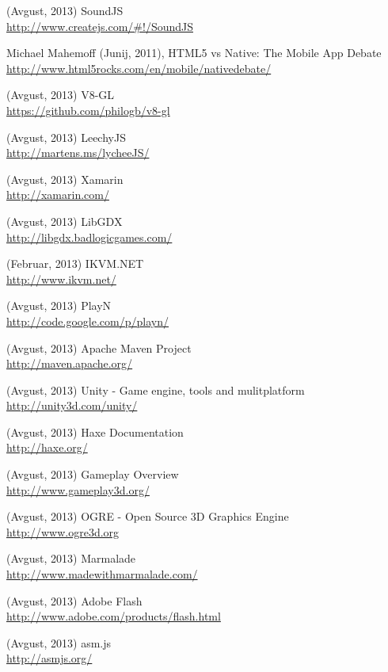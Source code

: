 \begin{thebibliography}{1}
 (Avgust, 2013) SoundJS
\\ \url{http://www.createjs.com/\#!/SoundJS}

 Michael Mahemoff (Junij, 2011), HTML5 vs Native: The Mobile App Debate
\\ \url{http://www.html5rocks.com/en/mobile/nativedebate/}

 (Avgust, 2013) V8-GL 
\\ \url{https://github.com/philogb/v8-gl}

 (Avgust, 2013) LeechyJS 
\\ \url{http://martens.ms/lycheeJS/}

 (Avgust, 2013) Xamarin
\\ \url{http://xamarin.com/}

 (Avgust, 2013) LibGDX 
\\ \url{http://libgdx.badlogicgames.com/}

 (Februar, 2013) IKVM.NET
\\ \url{http://www.ikvm.net/}

 (Avgust, 2013) PlayN 
\\ \url{http://code.google.com/p/playn/}

 (Avgust, 2013) Apache Maven Project
\\ \url{http://maven.apache.org/}

 (Avgust, 2013) Unity - Game engine, tools and mulitplatform
\\ \url{http://unity3d.com/unity/}

 (Avgust, 2013) Haxe Documentation
\\ \url{http://haxe.org/}

 (Avgust, 2013) Gameplay Overview
\\ \url{http://www.gameplay3d.org/}

 (Avgust, 2013) OGRE - Open Source 3D Graphics Engine
\\ \url{http://www.ogre3d.org}

 (Avgust, 2013) Marmalade
\\ \url{http://www.madewithmarmalade.com/}

 (Avgust, 2013) Adobe Flash
\\ \url{http://www.adobe.com/products/flash.html}

 (Avgust, 2013) asm.js
\\ \url{http://asmjs.org/}


\end{thebibliography}
